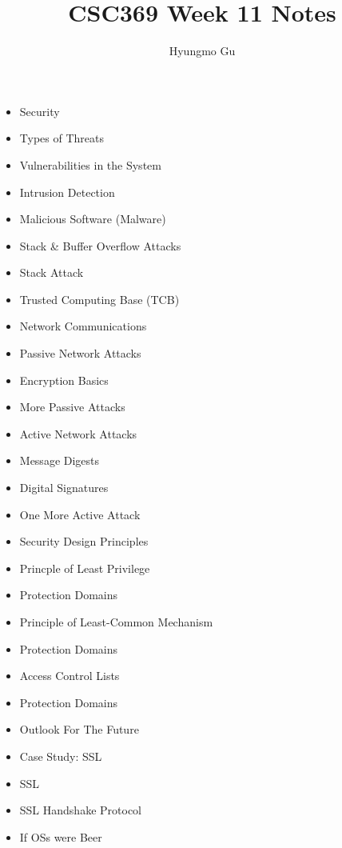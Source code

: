 \documentclass[12pt]{article}
\begin{document}
\title{CSC369 Week 11 Notes}
\author{Hyungmo Gu}
\maketitle

\begin{itemize}
    \item Security
    \item Types of Threats
    \item Vulnerabilities in the System
    \item Intrusion Detection
    \item Malicious Software (Malware)
    \item Stack \& Buffer Overflow Attacks
    \item Stack Attack
    \item Trusted Computing Base (TCB)
    \item Network Communications
    \item Passive Network Attacks
    \item Encryption Basics
    \item More Passive Attacks
    \item Active Network Attacks
    \item Message Digests
    \item Digital Signatures
    \item One More Active Attack
    \item Security Design Principles
    \item Princple of Least Privilege
    \item Protection Domains
    \item Principle of Least-Common Mechanism
    \item Protection Domains
    \item Access Control Lists
    \item Protection Domains
    \item Outlook For The Future
    \item Case Study: SSL
    \item SSL
    \item SSL Handshake Protocol
    \item If OSs were Beer
\end{itemize}
\end{document}
